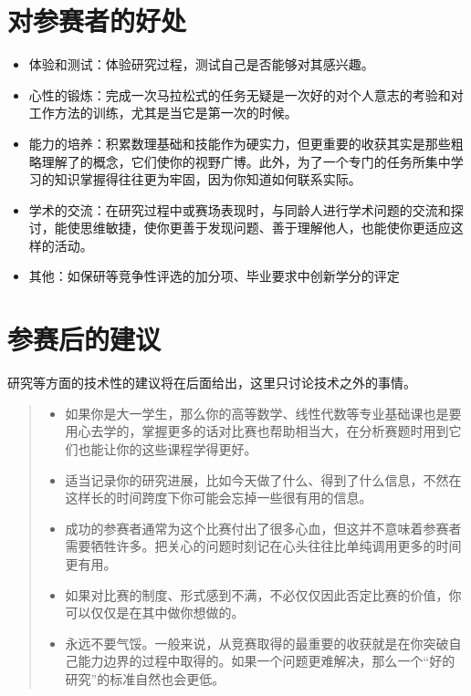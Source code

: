 \documentclass[a4paper,10pt,english]{sphinxmanual}
\begin{document}
\section{对参赛者的好处}
\label{\detokenize{2. Intro_Tournament:id10}}\begin{itemize}
\item {} 
体验和测试：体验研究过程，测试自己是否能够对其感兴趣。

\item {} 
心性的锻炼：完成一次马拉松式的任务无疑是一次好的对个人意志的考验和对工作方法的训练，尤其是当它是第一次的时候。

\item {} 
能力的培养：积累数理基础和技能作为硬实力，但更重要的收获其实是那些粗略理解了的概念，它们使你的视野广博。此外，为了一个专门的任务所集中学习的知识掌握得往往更为牢固，因为你知道如何联系实际。

\item {} 
学术的交流：在研究过程中或赛场表现时，与同龄人进行学术问题的交流和探讨，能使思维敏捷，使你更善于发现问题、善于理解他人，也能使你更适应这样的活动。

\item {} 
其他：如保研等竞争性评选的加分项、毕业要求中创新学分的评定

\end{itemize}


\section{参赛后的建议}
\label{\detokenize{2. Intro_Tournament:id11}}
研究等方面的技术性的建议将在后面给出，这里只讨论技术之外的事情。
\begin{quote}
\begin{itemize}
\item {} 
如果你是大一学生，那么你的高等数学、线性代数等专业基础课也是要用心去学的，掌握更多的话对比赛也帮助相当大，在分析赛题时用到它们也能让你的这些课程学得更好。

\item {} 
适当记录你的研究进展，比如今天做了什么、得到了什么信息，不然在这样长的时间跨度下你可能会忘掉一些很有用的信息。

\item {} 
成功的参赛者通常为这个比赛付出了很多心血，但这并不意味着参赛者需要牺牲许多。把关心的问题时刻记在心头往往比单纯调用更多的时间更有用。

\item {} 
如果对比赛的制度、形式感到不满，不必仅仅因此否定比赛的价值，你可以仅仅是在其中做你想做的。

\item {} 
永远不要气馁。一般来说，从竞赛取得的最重要的收获就是在你突破自己能力边界的过程中取得的。如果一个问题更难解决，那么一个“好的研究”的标准自然也会更低。

\end{itemize}

\end{quote}
\end{document}
